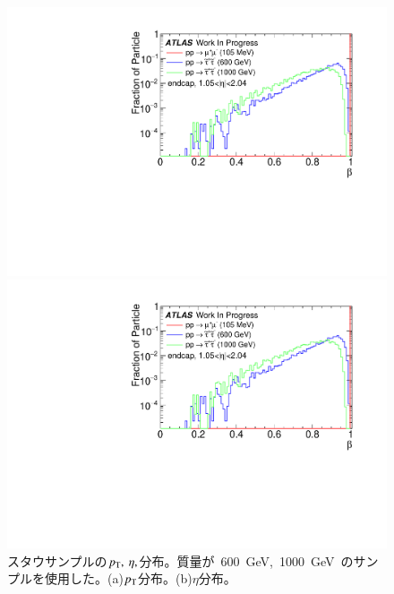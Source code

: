 \begin{figure}[H]
    \begin{minipage}{0.49\hsize}
    \centering   
    \includegraphics[width=\textwidth,page=2]{img/plot/beta.pdf}
    \subcaption{}
    \end{minipage}
    \begin{minipage}{0.49\hsize}
    \centering   
    \includegraphics[width=\textwidth,page=3]{img/plot/beta.pdf}
    \subcaption{}
    \end{minipage}
    \caption[スタウサンプルの$p_{\rm{T}},~\eta,$分布]{スタウサンプルの$p_{\rm{T}},~\eta,$分布。質量が~600~GeV,~1000~GeV~のサンプルを使用した。(a)$p_{\rm{T}}$分布。(b)$\eta$分布。}\label{fig:staud1}
\end{figure}

